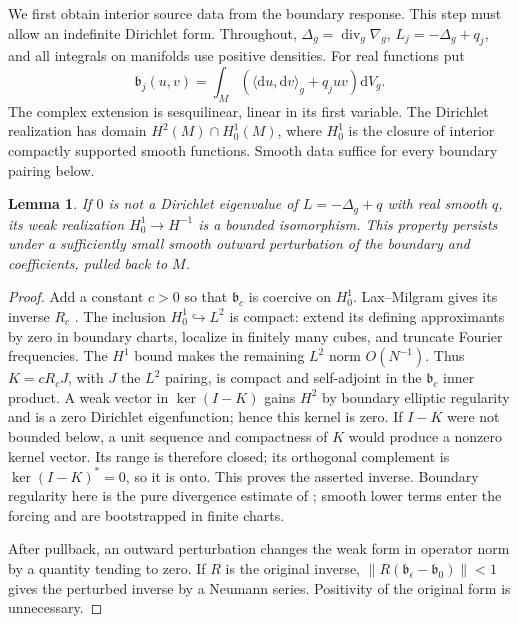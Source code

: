 \documentclass[11pt]{article}
\newtheorem{lemma}[theorem]{Lemma}
\theoremstyle{definition}\newtheorem{definition}[theorem]{Definition}
\theoremstyle{remark}\newtheorem{remark}[theorem]{Remark}
\newcommand{\dd}{\mathrm d}
\newcommand{\vol}{\dd V}
\newcommand{\Div}{\operatorname{div}}
\newcommand{\ip}[2]{\langle #1,#2\rangle}
\newcommand{\norm}[1]{\lVert #1\rVert}
\begin{document}
We first obtain interior source data from the boundary response. This step
must allow an indefinite Dirichlet form. Throughout, $\Delta_g=\Div_g\nabla_g$,
$L_j=-\Delta_g+q_j$, and all integrals on manifolds use positive densities.
For real functions put
\[
 \mathfrak b_j(u,v)=\int_M(\ip{\dd u}{\dd v}_g+q_juv)\vol_g.
\]
The complex extension is sesquilinear, linear in its first variable. The
Dirichlet realization has domain $H^2(M)\cap H^1_0(M)$, where $H^1_0$ is
the closure of interior compactly supported smooth functions. Smooth data
suffice for every boundary pairing below.

\begin{lemma}\label{lem:inverse}
If $0$ is not a Dirichlet eigenvalue of $L=-\Delta_g+q$ with real smooth
$q$, its weak realization $H^1_0\to H^{-1}$ is a bounded isomorphism.
This property persists under a sufficiently small smooth outward
perturbation of the boundary and coefficients, pulled back to $M$.
\end{lemma}
\begin{proof}
Add a constant $c>0$ so that $\mathfrak b_c$ is coercive on $H^1_0$.
Lax--Milgram gives its inverse $R_c$ \cite[Theorem 4.20]{HunterPDE}.
The inclusion $H^1_0\hookrightarrow L^2$ is compact: extend its defining
approximants by zero in boundary charts, localize in finitely many cubes,
and truncate Fourier frequencies. The $H^1$ bound makes the remaining
$L^2$ norm $O(N^{-1})$. Thus $K=cR_cJ$, with $J$ the $L^2$ pairing, is
compact and self-adjoint in the $\mathfrak b_c$ inner product.
A weak vector in $\ker(I-K)$ gains $H^2$ by boundary elliptic regularity
and is a zero Dirichlet eigenfunction; hence this kernel is zero.
If $I-K$ were not bounded below, a unit sequence and compactness of $K$
would produce a nonzero kernel vector. Its range is therefore closed;
its orthogonal complement is $\ker(I-K)^*=0$, so it is onto.
This proves the asserted inverse. Boundary regularity here is the
pure divergence estimate of \cite[Theorems 4.30--4.31]{HunterPDE}; smooth
lower terms enter the forcing and are bootstrapped in finite charts.

After pullback, an outward perturbation changes the weak form in operator
norm by a quantity tending to zero. If $R$ is the original inverse,
$\norm{R(\mathfrak b_\epsilon-\mathfrak b_0)}<1$ gives the perturbed inverse
by a Neumann series. Positivity of the original form is unnecessary.
\end{proof}
\end{document}
